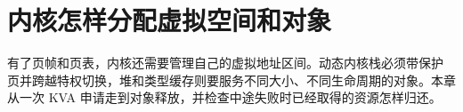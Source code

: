 \chapter{内核怎样分配虚拟空间和对象}

有了页帧和页表，内核还需要管理自己的虚拟地址区间。动态内核栈必须带保护
页并跨越特权切换，堆和类型缓存则要服务不同大小、不同生命周期的对象。本章
从一次 KVA 申请走到对象释放，并检查中途失败时已经取得的资源怎样归还。





